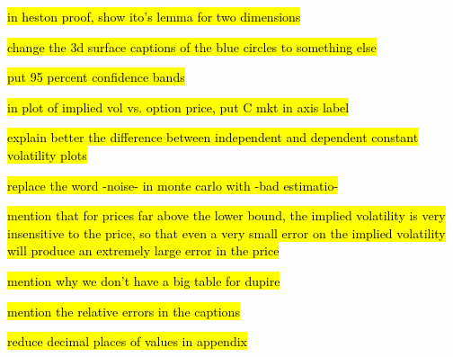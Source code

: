 \hl{in heston proof, show ito's lemma for two dimensions}

\hl{change the 3d surface captions of the blue circles to something else}

\hl{put 95 percent confidence bands}


\hl{in plot of implied vol vs. option price, put C mkt in axis label}

\hl{explain better the difference between independent and dependent constant volatility plots}

\hl{replace the word -noise- in monte carlo with -bad estimatio- }

\hl{mention that for prices far above the lower bound, the implied volatility is very insensitive to the price, so that even a very small error on the implied volatility will produce an extremely large error in the price}

\hl{mention why we don't have a big table for dupire}

\hl{mention the relative errors in the captions}

\hl{reduce decimal places of values in appendix}
